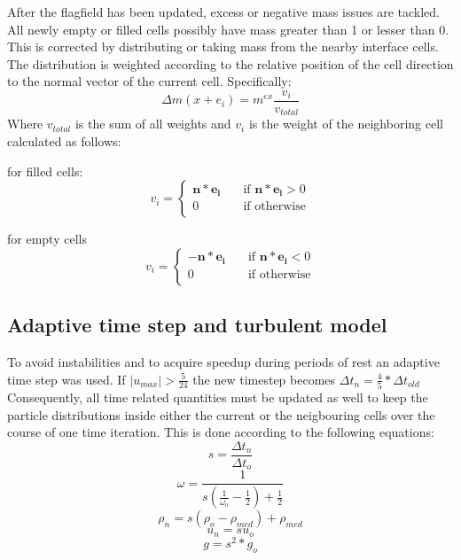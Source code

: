 \documentclass[10pt,a4paper,notitlepage]{article}
\begin{document}
After the flagfield has been updated, excess or negative mass issues are tackled. All newly empty or filled cells possibly have mass greater than 1 or lesser than 0. This is corrected by distributing or taking mass from the nearby interface cells. The distribution is weighted according to the relative position of the cell direction to the normal vector of the current cell. Specifically:
\begin{equation} \label{eq:exmass}
\Delta m(x+e_{i})=m^{ex}\frac{v_{i}}{v_{total}}
\end{equation}
Where $v_{total}$ is the sum of all weights and $v_{i}$ is the weight of the neighboring cell calculated as follows:

for filled cells:
\begin{equation} \label{eq:filledweight}
  v_i = 
  \begin{cases}
    \mathbf{n*e_{i}}     & \quad \text{if }  \text{$\mathbf{n*e_{i}}>0$}\\
    0			 & \quad \text{if }  \text{otherwise}\\
  \end{cases}
\end{equation}

for empty cells
\begin{equation} \label{eq:emptyweight}
  v_i = 
  \begin{cases}
    -\mathbf{n*e_{i}}     & \quad \text{if }  \text{$\mathbf{n*e_{i}}<0$}\\
    0			  & \quad \text{if }  \text{otherwise}\\
  \end{cases}
\end{equation}

\subsection{Adaptive time step and turbulent model}

To avoid instabilities and to acquire speedup during periods of rest an adaptive time step was used. If $|u_{max}|>\frac{5}{24}$ the new timestep becomes $\Delta t_{n}=\frac{4}{5}*\Delta t_{old}$
Consequently, all time related quantities must be updated as well to keep the particle distributions inside either the current or the neigbouring cells over the course of one time iteration. This is done according to the following equations:
\begin{equation} \label{eq:dt}
s=\frac{\Delta t_{n}}{\Delta t_{o}}
\end{equation}
\begin{equation} \label{eq:omega}
\omega=\frac{1}{s(\frac{1}{\omega_{o}}-\frac{1}{2})+\frac{1}{2}}
\end{equation}
\begin{equation} \label{eq:density}
\rho_{n}=s(\rho_{o}-\rho_{med})+\rho_{med}
\end{equation}
\begin{equation} \label{eq:velocity}
u_{n}=su_{o}
\end{equation}
\begin{equation} \label{eq:gravity}
g=s^{2}*g_{o}
\end{equation}
\end{document}
